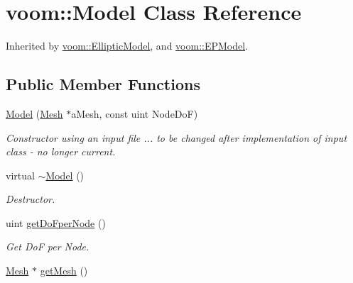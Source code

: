 \hypertarget{classvoom_1_1_model}{
\section{voom::Model Class Reference}
\label{classvoom_1_1_model}
}


Inherited by \hyperlink{classvoom_1_1_elliptic_model}{voom::EllipticModel}, and \hyperlink{classvoom_1_1_e_p_model}{voom::EPModel}.\subsection*{Public Member Functions}
\begin{DoxyCompactItemize}
\item 
\hyperlink{classvoom_1_1_model_aa9d7f41277483cb4141fcbb7556871a6}{Model} (\hyperlink{classvoom_1_1_mesh}{Mesh} $\ast$aMesh, const uint NodeDoF)
\begin{DoxyCompactList}\small\item\em Constructor using an input file ... to be changed after implementation of input class -\/ no longer current. \item\end{DoxyCompactList}\item 
\hypertarget{classvoom_1_1_model_a869e4cc6519472565b76e1538ff648ac}{
virtual \hyperlink{classvoom_1_1_model_a869e4cc6519472565b76e1538ff648ac}{$\sim$Model} ()}
\label{classvoom_1_1_model_a869e4cc6519472565b76e1538ff648ac}

\begin{DoxyCompactList}\small\item\em Destructor. \item\end{DoxyCompactList}\item 
\hypertarget{classvoom_1_1_model_afb0f52e49b04d47d08f62c973e908ece}{
uint \hyperlink{classvoom_1_1_model_afb0f52e49b04d47d08f62c973e908ece}{getDoFperNode} ()}
\label{classvoom_1_1_model_afb0f52e49b04d47d08f62c973e908ece}

\begin{DoxyCompactList}\small\item\em Get DoF per Node. \item\end{DoxyCompactList}\item 
\hypertarget{classvoom_1_1_model_ab1b3e8a1af2702c9d7bf9b6c32221f34}{
\hyperlink{classvoom_1_1_mesh}{Mesh} $\ast$ \hyperlink{classvoom_1_1_model_ab1b3e8a1af2702c9d7bf9b6c32221f34}{getMesh} ()}
\label{classvoom_1_1_model_ab1b3e8a1af2702c9d7bf9b6c32221f34}


\end{DoxyCompactItemize}

